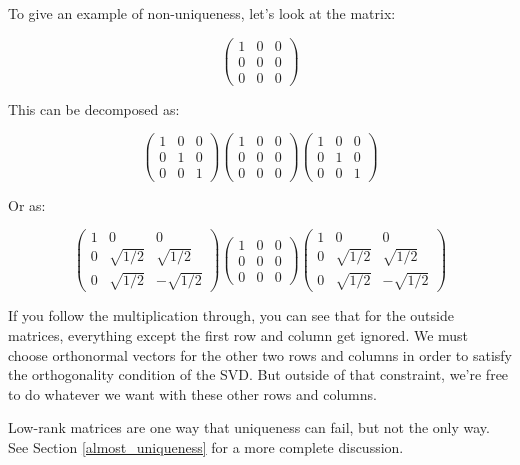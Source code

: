 \documentclass{amsbook}
\begin{document}
\begin{tcolorbox}[title=Example,colback=blue!5]
To give an example of non-uniqueness, let's look at the matrix:

$$
\left(\begin{array}{ccc}1&0&0\\0&0&0\\0&0&0\end{array}\right)
$$

This can be decomposed as:

$$
\left(\begin{array}{ccc}1&0&0\\0&1&0\\0&0&1\end{array}\right)
\left(\begin{array}{ccc}1&0&0\\0&0&0\\0&0&0\end{array}\right)
\left(\begin{array}{ccc}1&0&0\\0&1&0\\0&0&1\end{array}\right)
$$

Or as:

$$
\left(\begin{array}{ccc}1&0&0\\0&\sqrt{1/2}&\sqrt{1/2}\\0&\sqrt{1/2}&-\sqrt{1/2}\end{array}\right)
\left(\begin{array}{ccc}1&0&0\\0&0&0\\0&0&0\end{array}\right)
\left(\begin{array}{ccc}1&0&0\\0&\sqrt{1/2}&\sqrt{1/2}\\0&\sqrt{1/2}&-\sqrt{1/2}\end{array}\right)
$$

If you follow the multiplication through, you can see that for the outside matrices, everything except the first row and column get ignored.  We must choose orthonormal vectors for the other two rows and columns in order to satisfy the orthogonality condition of the SVD.  But outside of that constraint, we're free to do whatever we want with these other rows and columns.\newline\newline

Low-rank matrices are one way that uniqueness can fail, but not the only way.  See Section \ref{almost_uniqueness} for a more complete discussion.
\end{tcolorbox}
\end{document}

